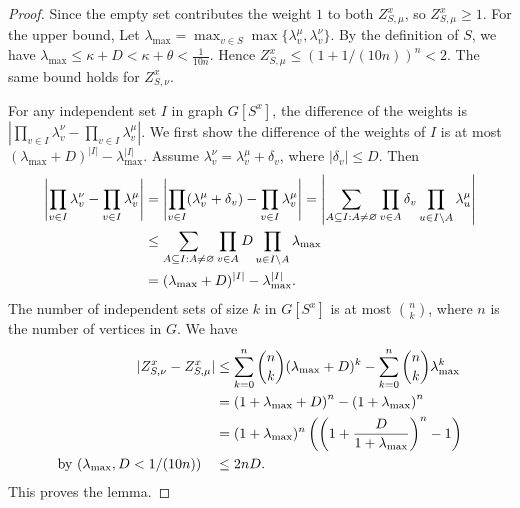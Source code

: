 \begin{proof}
    Since the empty set contributes the weight $1$ to both $Z_{S,\mu}^x$, so $Z_{S,\mu}^x \geq 1$. For the upper bound, Let $\lambda_{\max} = \max_{v \in S} \max \{\lambda_v^\mu,\lambda_v^\nu\}$. By the definition of $S$, we have $\lambda_{\max} \leq \kappa + D < \kappa + \theta < \frac{1}{10n}$. Hence $Z_{S,\mu}^x \leq (1+1/(10n))^n < 2$. The same bound holds for $Z_{S,\nu}^x$.

    For any independent set $I$ in graph $G[S^x]$, the difference of the weights is $\left\vert \prod_{v\in I}\lambda_v^\nu-\prod_{v\in I} \lambda_v^\mu\right\vert$. We first show the difference of the weights of $I$ is at most $(\lambda_{\max}+D)^{|I|} - \lambda_{\max}^{|I|}$. Assume $\lambda_v^\nu = \lambda_v^\mu + \delta_v$, where $|\delta_v| \leq D$. Then 
    \begin{align}\label{eq:max-diff}
        \left\vert \prod_{v\in I}\lambda_v^\nu-\prod_{v\in I} \lambda_v^\mu\right\vert &= \left\vert \prod_{v\in I}(\lambda_v^\mu + \delta_v)-\prod_{v\in I} \lambda_v^\mu\right\vert = \left\vert \sum_{A \subseteq I: A \neq \emptyset} \prod_{v \in A}\delta_v \prod_{u \in I \setminus A} \lambda_u^\mu\right\vert\notag\\
        &\leq \sum_{A \subseteq I: A \neq \emptyset} \prod_{v \in A}D \prod_{u \in I \setminus A} \lambda_{\max}\notag\\
        &= (\lambda_{\max}+D)^{|I|} - \lambda_{\max}^{|I|}. 
    \end{align}
    The number of independent sets of size $k$ in $G[S^x]$ is at most $\binom{n}{k}$, where $n$ is the number of vertices in $G$. We have
    \begin{align}\label{eq:max-diff-sum}
      \vert Z_{S,\nu}^x-Z_{S,\mu}^x \vert &\leq \sum_{k=0}^n \binom{n}{k} (\lambda_{\max}+D)^k - \sum_{k=0}^n \binom{n}{k}\lambda_{\max}^k \notag\\
         &= \left(1+\lambda_{\max}+D\right)^n - \left(1+\lambda_{\max}\right)^n\notag\\
         &= (1+\lambda_{\max})^n\left( \left(1+\frac{D}{1+\lambda_{\max}}\right)^n -1 \right)\notag\\
    \text{by ($\lambda_{\max},D <1/(10n)$)}\quad &\leq 2nD.
    \end{align}
This proves the lemma.
\end{proof}

